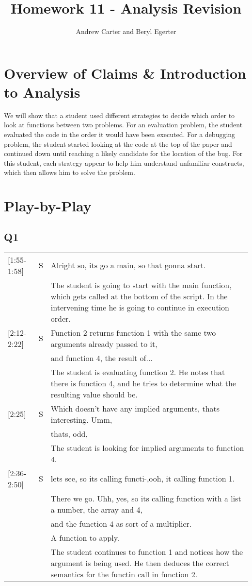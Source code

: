 \documentclass{article}
\title{Homework 11 - Analysis Revision}
\author{Andrew Carter and Beryl Egerter}
\begin{document}
\maketitle
\section{Overview of Claims \& Introduction to Analysis}

We will show that a student used different strategies to decide which order to look at functions between two problems.
For an evaluation problem, the student evaluated the code in the order it would have been executed.
For a debugging problem, the student started looking at the code at the top of the paper and continued down until reaching a likely candidate for the location of the bug.
For this student, each strategy appear to help him understand unfamiliar constructs, which then allows him to solve the problem.

\section{Play-by-Play}
\subsection{Q1}
\begin{tabular}{lcp{15cm}}
[1:55-1:58] & S & Alright so, its go a main, so that gonna start. \\

&& The student is going to start with the main function, which gets called at the bottom of the script.
In the intervening time he is going to continue in execution order. \\

[2:12-2:22] & S& 
	Function 2 returns function 1 with the same two arguments already passed to it,\\
&&	and function 4, the result of... \\

&& The student is evaluating function 2.
He notes that there is function 4, and he tries to determine what the resulting value should be. \\

[2:25] & S &
	Which doesn't have any implied arguments, thats interesting. Umm, \\
[2:35] & & thats, odd, \\

&& The student is looking for implied arguments to function 4. \\

[2:36-2:50] & S &
	lets see, so its calling functi-,ooh, it calling function 1.\\
&&	There we go. Uhh, yes, so its calling function with a list a number, the array and 4,\\
&&	and the function 4 as sort of a multiplier.\\
&&	A function to apply. \\

&& The student continues to function 1 and notices how the argument is being used.
He then deduces the correct semantics for the functin call in function 2. \\
\end{tabular}
\end{document}
